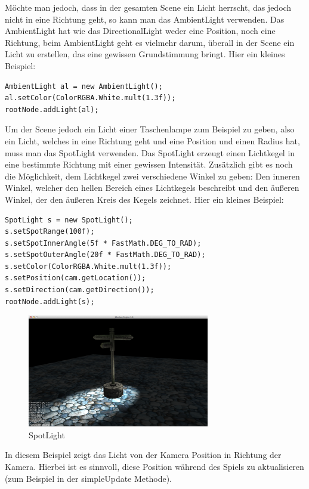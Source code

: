 Möchte man jedoch, dass in der gesamten Scene ein Licht herrscht, das jedoch nicht in eine Richtung geht, so kann man das AmbientLight verwenden. Das AmbientLight hat wie das DirectionalLight weder eine Position, noch eine Richtung, beim AmbientLight geht es vielmehr darum, überall in der Scene ein Licht zu erstellen, das eine gewissen Grundstimmung bringt. Hier ein kleines Beispiel:

\begin{lstlisting}
AmbientLight al = new AmbientLight();
al.setColor(ColorRGBA.White.mult(1.3f));
rootNode.addLight(al);
\end{lstlisting}

Um der Scene jedoch ein Licht einer Taschenlampe zum Beispiel zu geben, also ein Licht, welches in eine Richtung geht und eine Position und einen Radius hat, muss man das SpotLight verwenden. Das SpotLight erzeugt einen Lichtkegel in eine bestimmte Richtung mit einer gewissen Intensität. Zusätzlich gibt es noch die Möglichkeit, dem Lichtkegel zwei verschiedene Winkel zu geben: Den inneren Winkel, welcher den hellen Bereich eines Lichtkegels beschreibt und den äußeren Winkel, der den äußeren Kreis des Kegels zeichnet. Hier ein kleines Beispiel:
\begin{lstlisting}
SpotLight s = new SpotLight();
s.setSpotRange(100f);                           
s.setSpotInnerAngle(5f * FastMath.DEG_TO_RAD); 
s.setSpotOuterAngle(20f * FastMath.DEG_TO_RAD); 
s.setColor(ColorRGBA.White.mult(1.3f));         
s.setPosition(cam.getLocation());         
s.setDirection(cam.getDirection());     
rootNode.addLight(s);
\end{lstlisting}
\begin{center}
	\begin{figure}[h!]
		
		
		\caption{SpotLight}
		
		\includegraphics[width=.5\linewidth]{images/spotlight} 
		
	\end{figure}  
\end{center}
In diesem Beispiel zeigt das Licht von der Kamera Position in Richtung der Kamera. Hierbei ist es sinnvoll, diese Position während des Spiels zu aktualisieren (zum Beispiel in der simpleUpdate Methode). 


